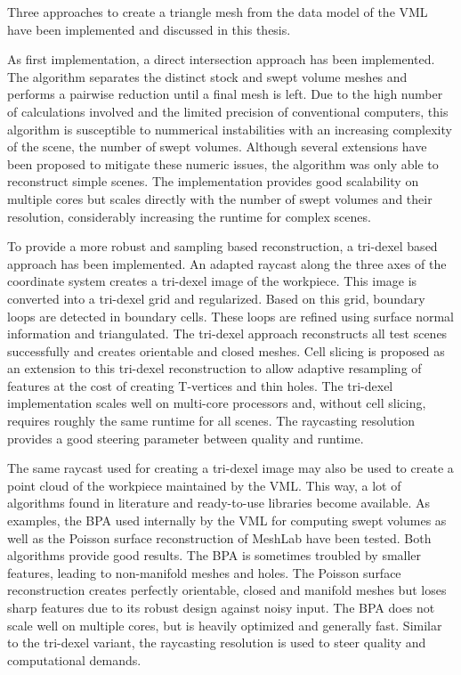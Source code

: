 Three approaches to create a triangle mesh from the data model of the VML have been implemented and discussed in this thesis.


As first implementation, a direct intersection approach has been implemented.
The algorithm separates the distinct stock and swept volume meshes and performs a pairwise reduction until a final mesh is left.
Due to the high number of calculations involved and the limited precision of conventional computers, this algorithm is susceptible to nummerical instabilities with an increasing complexity of the scene, \eg the number of swept volumes.
Although several extensions have been proposed to mitigate these numeric issues, the algorithm was only able to reconstruct simple scenes.
The implementation provides good scalability on multiple cores but scales directly with the number of swept volumes and their resolution, considerably increasing the runtime for complex scenes.

To provide a more robust and sampling based reconstruction, a tri-dexel based approach has been implemented.
An adapted raycast along the three axes of the coordinate system creates a tri-dexel image of the workpiece.
This image is converted into a tri-dexel grid and regularized.
Based on this grid, boundary loops are detected in boundary cells.
These loops are refined using surface normal information and triangulated.
The tri-dexel approach reconstructs all test scenes successfully and creates orientable and closed meshes.
Cell slicing is proposed as an extension to this tri-dexel reconstruction to allow adaptive resampling of features at the cost of creating T-vertices and thin holes.
The tri-dexel implementation scales well on multi-core processors and, without cell slicing, requires roughly the same runtime for all scenes.
The raycasting resolution provides a good steering parameter between quality and runtime.

The same raycast used for creating a tri-dexel image may also be used to create a point cloud of the workpiece maintained by the VML.
This way, a lot of algorithms found in literature and ready-to-use libraries become available.
As examples, the BPA used internally by the VML for computing swept volumes as well as the Poisson surface reconstruction of MeshLab have been tested.
Both algorithms provide good results.
The BPA is sometimes troubled by smaller features, leading to non-manifold meshes and holes.
The Poisson surface reconstruction creates perfectly orientable, closed and manifold meshes but loses sharp features due to its robust design against noisy input.
The BPA does not scale well on multiple cores, but is heavily optimized and generally fast.
Similar to the tri-dexel variant, the raycasting resolution is used to steer quality and computational demands.


